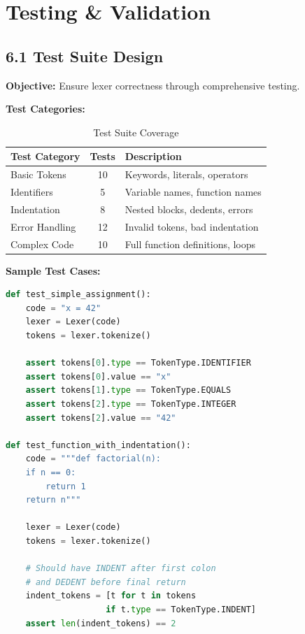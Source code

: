 \documentclass[a4paper,11pt]{article}
\begin{document}
\section{Testing \& Validation}

\subsection{6.1 Test Suite Design}

\textbf{Objective:} Ensure lexer correctness through comprehensive testing.

\textbf{Test Categories:}

\begin{table}[h]
\centering
\begin{tabularx}{\textwidth}{|l|c|X|}
\hline
\rowcolor{blue!10}
\textbf{Test Category} & \textbf{Tests} & \textbf{Description} \\
\hline
Basic Tokens & 10 & Keywords, literals, operators \\
\hline
Identifiers & 5 & Variable names, function names \\
\hline
Indentation & 8 & Nested blocks, dedents, errors \\ %
\hline
Error Handling & 12 & Invalid tokens, bad indentation \\
\hline
Complex Code & 10 & Full function definitions, loops \\
\hline
\end{tabularx}
\caption{Test Suite Coverage}
\end{table}

\textbf{Sample Test Cases:}

\begin{lstlisting}[language=Python, caption=Lexer Test Examples]
def test_simple_assignment():
    code = "x = 42"
    lexer = Lexer(code)
    tokens = lexer.tokenize()
    
    assert tokens[0].type == TokenType.IDENTIFIER
    assert tokens[0].value == "x"
    assert tokens[1].type == TokenType.EQUALS
    assert tokens[2].type == TokenType.INTEGER
    assert tokens[2].value == "42"

def test_function_with_indentation():
    code = """def factorial(n):
    if n == 0:
        return 1
    return n"""
    
    lexer = Lexer(code)
    tokens = lexer.tokenize()
    
    # Should have INDENT after first colon
    # and DEDENT before final return
    indent_tokens = [t for t in tokens 
                    if t.type == TokenType.INDENT]
    assert len(indent_tokens) == 2
\end{lstlisting}
\end{document}
